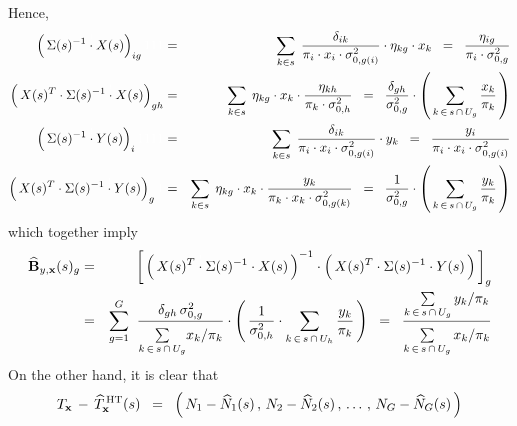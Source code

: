 Hence,
\begin{eqnarray*}
\left(\,\Sigma(s)^{-1} \overset{{\color{white}!}}{\cdot} X(s)\right)_{ig}{\color{white}111}
& = &
	\underset{k \in s}{\sum}\;\,
	\dfrac{\delta_{ik}}{\pi_{i} \cdot x_{i} \cdot \sigma^{2}_{0,g(i)}}
	\cdot
	\eta_{kg} \cdot x_{k}
\;\; = \;\;
	\dfrac{\eta_{ig}}{\pi_{i}\cdot\sigma^{2}_{0,g}}
\\
\left(\,X(s)^{T}\cdot\Sigma(s)^{-1} \overset{{\color{white}!}}{\cdot} X(s)\right)_{gh}
& = &
	\underset{k \in s}{\sum}\;\,
	\eta_{kg} \cdot x_{k} \cdot \dfrac{\eta_{kh}}{\pi_{k} \cdot \sigma^{2}_{0,h}}
\;\; = \;\;
	\dfrac{\delta_{gh}}{\sigma^{2}_{0,g}}
	\cdot
	\left(\,\underset{k\,\in\,s\,\cap\,U_{g}}{\sum}\,\dfrac{x_{k}}{\pi_{k}}\,\right)
\\
\left(\,\Sigma(s)^{-1} \overset{{\color{white}!}}{\cdot} Y(s)\right)_{i}{\color{white}1111}
& = &
	\underset{k \in s}{\sum}\;\,
	\dfrac{\delta_{ik}}{\pi_{i} \cdot x_{i} \cdot \sigma^{2}_{0,g(i)}}
	\cdot
	y_{k}
\;\; = \;\;
	\dfrac{y_{i}}{\pi_{i} \cdot x_{i} \cdot \sigma^{2}_{0,g(i)}}
\\
\left(\,X(s)^{T}\cdot\Sigma(s)^{-1} \overset{{\color{white}!}}{\cdot} Y(s)\right)_{g}{\color{white}1}
& = &
	\underset{k \in s}{\sum}\;\,
	\eta_{kg} \cdot x_{k} \cdot \dfrac{y_{k}}{\pi_{k} \cdot x_{k} \cdot \sigma^{2}_{0,g(k)}}
\;\; = \;\;
	\dfrac{1}{\sigma^{2}_{0,g}}
	\cdot
	\left(\, \underset{k\,\in\,s\,\cap\,U_{g}}{\sum}\, \dfrac{y_{k}}{\pi_{k}} \,\right)
\end{eqnarray*}
which together imply
\begin{eqnarray*}
\widehat{\mathbf{B}}_{y,\mathbf{x}}(s)_{g}
& = &
	\left[\,
		\left(\,X(s)^{T} \overset{{\color{white}!}}{\cdot} \Sigma(s)^{-1} \cdot X(s)\,\right)^{-1}
		\cdot
		\left(\,X(s)^{T} \overset{{\color{white}!}}{\cdot} \Sigma(s)^{-1} \cdot Y(s) \,\right)
	\,\right]_{g}
\\
& = &
	\overset{G}{\underset{g=1}{\sum}}\;\;
	\dfrac{
		\delta_{gh}\,\sigma^{2}_{0,g}
	}{
		\overset{{\color{white}.}}{\underset{k\,\in\,s\,\cap\,U_{g}}{\sum} x_{k}/\pi_{k}}
	}
	\cdot
	\left(\,
		\dfrac{1}{\sigma^{2}_{0,h}}
		\cdot
		\underset{k\,\in\,s\,\cap\,U_{h}}{\sum}\, \dfrac{y_{k}}{\pi_{k}}
	\,\right)
\;\; = \;\;
	\dfrac{
		\underset{k\,\in\,s\,\cap\,U_{g}}{\sum}\, y_{k} / \pi_{k}
	}{
		\overset{{\color{white}.}}{\underset{k\,\in\,s\,\cap\,U_{g}}{\sum}\, x_{k}/\pi_{k}}
	}
\end{eqnarray*}
On the other hand, it is clear that
\begin{equation*}
T_{\mathbf{x}} \,-\, \widehat{T}^{\,\textnormal{HT}}_{\mathbf{x}}(s)
\;\; = \;\;
	\left(\, N_{1} - \widehat{N}_{1}(s) \,,\, N_{2} - \widehat{N}_{2}(s) \,,\, \ldots \,,\, N_{G} - \widehat{N}_{G}(s) \,\right)
\end{equation*}

